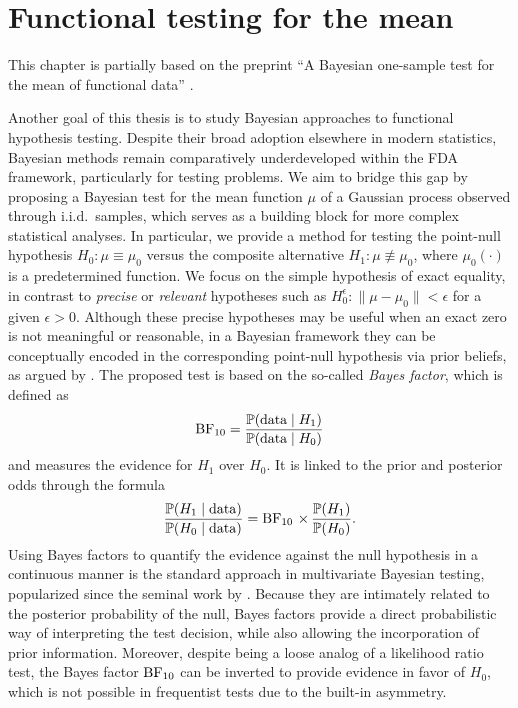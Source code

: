 \chapter{Functional testing for the mean}\label{ch:functional-testing}

\begin{flushannotation}
  {This chapter is partially based on the preprint
  ``A Bayesian one-sample test for the mean of functional data''
  \citep{berrendero2026bayesian}.}
\end{flushannotation}

\noindent Another goal of this thesis is to study Bayesian approaches to functional hypothesis testing. Despite their broad adoption elsewhere in modern statistics, Bayesian methods remain comparatively underdeveloped within the \acs{FDA} framework, particularly for testing problems. We aim to bridge this gap by proposing a Bayesian test for the mean function \(\mu\) of a Gaussian process observed through i.i.d.\ samples, which serves as a building block for more complex statistical analyses. In particular, we provide a method for testing the point-null hypothesis \(H_0: \mu \equiv \mu_0\) versus the composite alternative \(H_1: \mu \not\equiv \mu_0\), where \(\mu_0(\cdot)\) is a predetermined function. We focus on the simple hypothesis of exact equality, in contrast to \textit{precise} or \textit{relevant} hypotheses such as \(H_0^\epsilon: \|\mu-\mu_0\| < \epsilon\) for a given \(\epsilon>0\). Although these precise hypotheses may be useful when an exact zero is not meaningful or reasonable, in a Bayesian framework they can be conceptually encoded in the corresponding point-null hypothesis via prior beliefs, as argued by \citet{berger1987testing}. The proposed test is based on the so-called \textit{Bayes factor}, which is defined as
\[
\operatorname{\text{BF}}_{10} = \frac{\mathbb{P}(\text{data}\mid H_1)}{\mathbb{P}(\text{data}\mid H_0)}
\]
and measures the evidence for \(H_1\) over \(H_0\). It is linked to the prior and posterior odds through the formula
\[
\frac{\mathbb{P}(H_1\mid \text{data})}{\mathbb{P}(H_0\mid \text{data})} = \operatorname{\text{BF}}_{10} \, \times\, \frac{\mathbb{P}(H_1)}{\mathbb{P}(H_0)}.
\]
Using Bayes factors to quantify the evidence against the null hypothesis in a continuous manner is the standard approach in multivariate Bayesian testing, popularized since the seminal work by \citet{kass1995bayes}. Because they are intimately related to the posterior probability of the null, Bayes factors provide a direct probabilistic way of interpreting the test decision, while also allowing the incorporation of prior information. Moreover, despite being a loose analog of a likelihood ratio test, the Bayes factor \(\operatorname{\text{BF}}_{10}\) can be inverted to provide evidence in favor of \(H_0\), which is not possible in frequentist tests due to the built-in asymmetry. 

